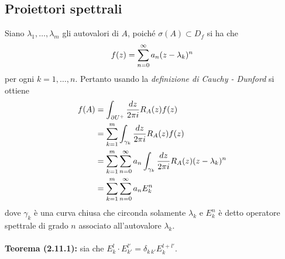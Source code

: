 \documentclass{article}
\begin{document}
\newpage
\subsection{Proiettori spettrali}
Siano $\lambda_1, \dots, \lambda_m$ gli autovalori di $A$, poiché $\sigma(A) \subset D_f$ si ha che
\begin{gather}
    f(z) = \sum_{n = 0}^\infty a_n(z - \lambda_k)^n \notag
\end{gather}
per ogni $k = 1, \dots, n$. Pertanto usando la \textit{definizione di Cauchy - Dunford} si ottiene
\begin{align}
    f(A) &= \int_{\partial U^+}\frac{dz}{2\pi i}R_A(z)f(z) \notag \\
    &= \sum_{k = 1}^m\int_{\gamma_k}\frac{dz}{2\pi i}R_A(z)f(z) \notag \\
    &= \sum_{k = 1}^m\sum_{n = 0}^\infty a_n\int_{\gamma_k}\frac{dz}{2\pi i}R_A(z)(z - \lambda_k)^n \notag \\
    &= \sum_{k = 1}^m\sum_{n = 0}^\infty a_n E_k^n \notag
\end{align}
dove $\gamma_k$ è una curva chiusa che circonda solamente $\lambda_k$ e $E_k^n$ è detto operatore spettrale di grado $n$ associato all'autovalore $\lambda_k$. \\ \\
\textbf{Teorema (2.11.1):} sia che $E_k^l \cdot E_{k'}^{l'} = \delta_{k \, k'}E_k^{l + l'}$. \\
\end{document}
